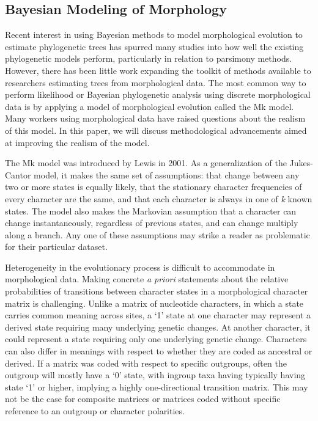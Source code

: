 \documentclass[]{article}
\begin{document}
\subsection{Bayesian Modeling of Morphology}
	Recent interest in using Bayesian methods to model morphological evolution to estimate phylogenetic trees has spurred many studies into how well the existing phylogenetic models perform, particularly in relation to parsimony methods.
	However, there has been little work expanding the toolkit of methods available to researchers estimating trees from morphological data. 
	The most common way to perform likelihood or Bayesian phylogenetic analysis using discrete morphological data is by applying a model of morphological evolution called the Mk model.
	Many workers using morphological data have raised questions about the realism of this model.
	In this paper, we will discuss methodological advancements aimed at improving the realism of the model. \par
	The Mk model was introduced by Lewis in 2001.
	As a generalization of the Jukes-Cantor model, it makes the same set of assumptions: that change between any two or more states  is equally likely, that the stationary character frequencies of every character are the same, and that each character is always in one of \textit{k} known states.
	The model also makes the Markovian assumption that a character can change instantaneously, regardless of previous states, and can change multiply along a branch. 
	Any one of these assumptions may strike a reader as problematic for their particular dataset. \par
	Heterogeneity in the evolutionary process is difficult to accommodate in morphological data. 
	Making concrete \textit{a priori} statements about the relative probabilities of transitions between character states in a morphological character matrix is challenging. 
	Unlike a matrix of nucleotide characters, in which a state carries common meaning across sites, a `1' state at one character may represent a derived state requiring many underlying genetic changes.
	At another character, it could represent a state requiring only one underlying genetic change.
	Characters can also differ in meanings with respect to whether they are coded as ancestral or derived.
	If a matrix was coded with respect to specific outgroups, often the outgroup will mostly have a `0' state, with ingroup taxa having typically having state `1' or higher, implying a highly one-directional transition matrix.
	This may not be the case for composite matrices or matrices coded without specific reference to an outgroup or character polarities.
\end{document}
